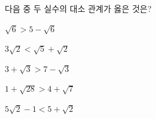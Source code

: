 다음 중 두 실수의 대소 관계가 옳은 것은?
\begin{choicesii}{\rule[-3ex]{0pt}{8ex}$\sqrt{6}>5-\sqrt{6}$}{\rule[-3ex]{0pt}{8ex}$3\sqrt{2}<\sqrt{5}+\sqrt{2}$}{\rule[-3ex]{0pt}{8ex}$3+\sqrt{3}>7-\sqrt{3}$}{\rule[-3ex]{0pt}{8ex}$1+\sqrt{28}>4+\sqrt{7}$}{\rule[-3ex]{0pt}{8ex}$5\sqrt{2}-1<5+\sqrt{2}$}\end{choicesii}
